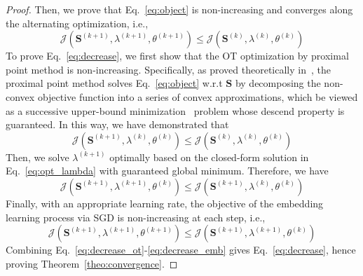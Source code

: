 \begin{proof}
    Then, we prove that Eq.~\eqref{eq:object} is non-increasing and converges along the alternating optimization, i.e.,
    \begin{equation}\label{eq:decrease}
        \mathcal{J}(\mathbf{S}^{(k+1)}, \lambda^{(k+1)}, \theta^{(k+1)})\leq \mathcal{J}(\mathbf{S}^{(k)}, \lambda^{(k)}, \theta^{(k)})
    \end{equation}
    To prove Eq.~\eqref{eq:decrease}, we first show that the OT optimization by proximal point method is non-increasing. Specifically, as proved theoretically in~\cite{gwl}, the proximal point method solves Eq.~\eqref{eq:object} w.r.t $\mathbf{S}$ by decomposing the non-convex objective function into a series of convex approximations, which be viewed as a successive upper-bound minimization~\cite{razaviyayn2013unified} problem whose descend property is guaranteed. In this way, we have demonstrated that
    \begin{equation}\label{eq:decrease_ot}
        \mathcal{J}(\mathbf{S}^{(k+1)}, \lambda^{(k)}, \theta^{(k)})\leq \mathcal{J}(\mathbf{S}^{(k)}, \lambda^{(k)}, \theta^{(k)})
    \end{equation}
    Then, we solve $\lambda^{(k+1)}$ optimally based on the closed-form solution in Eq.~\eqref{eq:opt_lambda} with guaranteed global minimum. Therefore, we have
    \begin{equation}\label{eq:decrease_lamda}
        \mathcal{J}(\mathbf{S}^{(k+1)}, \lambda^{(k+1)}, \theta^{(k)})\leq \mathcal{J}(\mathbf{S}^{(k+1)}, \lambda^{(k)}, \theta^{(k)})
    \end{equation}
    Finally, with an appropriate learning rate, the objective of the embedding learning process via SGD is non-increasing at each step, i.e.,
    \begin{equation}\label{eq:decrease_emb}
        \mathcal{J}(\mathbf{S}^{(k+1)}, \lambda^{(k+1)}, \theta^{(k+1)})\leq \mathcal{J}(\mathbf{S}^{(k+1)}, \lambda^{(k+1)}, \theta^{(k)})
    \end{equation}
    Combining Eq.~\eqref{eq:decrease_ot}-\eqref{eq:decrease_emb} gives Eq.~\eqref{eq:decrease}, hence proving Theorem~\ref{theo:convergence}.
\end{proof}

\vspace{-10pt}
